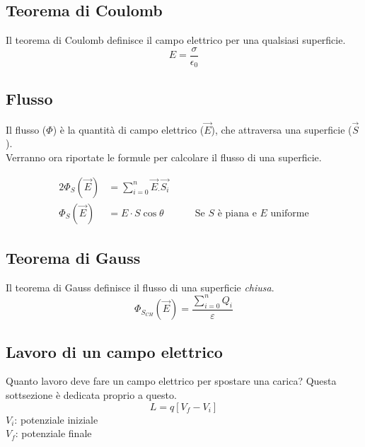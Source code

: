\subsection{Teorema di Coulomb}
Il teorema di Coulomb definisce il campo elettrico per una qualsiasi superficie.
\begin{equation*}
E = \frac{\sigma}{\epsilon_0}
\end{equation*}

\subsection{Flusso} \label{subsec:flusso}
Il flusso ($\Phi$) è la quantità di campo elettrico ($\vec{E}$), che 
attraversa una superficie ($\vec{S}$).\\
Verranno ora riportate le formule per calcolare il flusso di una superficie.

\begin{alignat*}{2}
  \Phi_S\left(\vec{E}\right) &= \sum\limits_{i=0}^{n}\vec{E}_\cdot\vec{S_i} &\quad &\\
  \Phi_S\left(\vec{E}\right) &= E\cdot S\cos\theta & &\text{Se } S \text{ è piana e } E \text{ 
  uniforme} 
\end{alignat*}
\begin{center}
\end{center}

\subsection{Teorema di Gauss}
Il teorema di Gauss definisce il flusso di una superficie \emph{chiusa}.
\begin{equation*}
\Phi_{S_{CH}}\left(\vec{E}\right) = \frac{\sum\limits_{i=0}^{n}Q_i}{\varepsilon}
\end{equation*}

\subsection{Lavoro di un campo elettrico}
Quanto lavoro deve fare un campo elettrico per spostare una carica? Questa sottsezione è dedicata 
proprio a questo.
\begin{equation*}
  L = q\left[V_f - V_i\right]
\end{equation*}
$V_i$: potenziale iniziale\\
$V_f$: potenziale finale\\ [\baselineskip]

